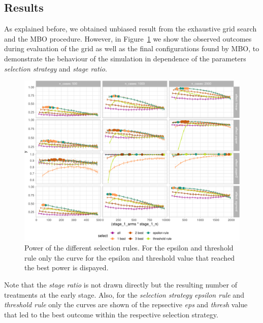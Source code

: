 \documentclass[bimj,fleqn]{w-art}
\theoremstyle{plain}
\theoremstyle{definition}
\begin{document}
\subsection{Results}

As explained before, we obtained unbiased result from the exhaustive grid search and the MBO procedure.
However, in Figure~\ref{fig:plot_allbest} we show the observed outcomes during evaluation of the grid as well as the final configurations found by MBO, to demonstrate the behaviour of the simulation in dependence of the parameters \emph{selection strategy} and \emph{stage ratio}.
\begin{figure}[htb]
\centering
\includegraphics[width=\linewidth]{generated/figures/plot_allbest.pdf}
\caption{Power of the different selection rules. For the epsilon and threshold rule only the curve for the epsilon and threshold value that reached the best power is dispayed.}
\label{fig:plot_allbest}
\end{figure}
Note that the \emph{stage ratio} is not drawn directly but the resulting number of treatments at the early stage.
Also, for the \emph{selection strategy} \emph{epsilon rule} and \emph{threshold rule} only the curves are shown of the repsective \emph{eps} and \emph{thresh} value that led to the best outcome within the respective selection strategy.
\end{document}
